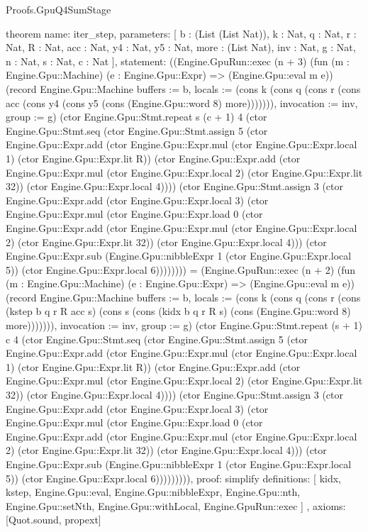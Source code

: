 \begin{lexlean}{Proofs.GpuQ4SumStage}
\begin{semanticmodule}
theorem{
  name: iter_step,
  parameters: [
    b : (List (List Nat)),
    k : Nat,
    q : Nat,
    r : Nat,
    R : Nat,
    acc : Nat,
    y4 : Nat,
    y5 : Nat,
    more : (List Nat),
    inv : Nat,
    g : Nat,
    n : Nat,
    s : Nat,
    c : Nat
  ],
  statement: ((Engine.GpuRun::exec (n + 3) (fun (m : Engine.Gpu::Machine) (e : Engine.Gpu::Expr) => (Engine.Gpu::eval m e)) (record Engine.Gpu::Machine {buffers := b, locals := (cons k (cons q (cons r (cons acc (cons y4 (cons y5 (cons (Engine.Gpu::word 8) more))))))), invocation := inv, group := g}) (ctor Engine.Gpu::Stmt.repeat s (c + 1) 4 (ctor Engine.Gpu::Stmt.seq (ctor Engine.Gpu::Stmt.assign 5 (ctor Engine.Gpu::Expr.add (ctor Engine.Gpu::Expr.mul (ctor Engine.Gpu::Expr.local 1) (ctor Engine.Gpu::Expr.lit R)) (ctor Engine.Gpu::Expr.add (ctor Engine.Gpu::Expr.mul (ctor Engine.Gpu::Expr.local 2) (ctor Engine.Gpu::Expr.lit 32)) (ctor Engine.Gpu::Expr.local 4)))) (ctor Engine.Gpu::Stmt.assign 3 (ctor Engine.Gpu::Expr.add (ctor Engine.Gpu::Expr.local 3) (ctor Engine.Gpu::Expr.mul (ctor Engine.Gpu::Expr.load 0 (ctor Engine.Gpu::Expr.add (ctor Engine.Gpu::Expr.mul (ctor Engine.Gpu::Expr.local 2) (ctor Engine.Gpu::Expr.lit 32)) (ctor Engine.Gpu::Expr.local 4))) (ctor Engine.Gpu::Expr.sub (Engine.Gpu::nibbleExpr 1 (ctor Engine.Gpu::Expr.local 5)) (ctor Engine.Gpu::Expr.local 6)))))))) = (Engine.GpuRun::exec (n + 2) (fun (m : Engine.Gpu::Machine) (e : Engine.Gpu::Expr) => (Engine.Gpu::eval m e)) (record Engine.Gpu::Machine {buffers := b, locals := (cons k (cons q (cons r (cons (kstep b q r R acc s) (cons s (cons (kidx b q r R s) (cons (Engine.Gpu::word 8) more))))))), invocation := inv, group := g}) (ctor Engine.Gpu::Stmt.repeat (s + 1) c 4 (ctor Engine.Gpu::Stmt.seq (ctor Engine.Gpu::Stmt.assign 5 (ctor Engine.Gpu::Expr.add (ctor Engine.Gpu::Expr.mul (ctor Engine.Gpu::Expr.local 1) (ctor Engine.Gpu::Expr.lit R)) (ctor Engine.Gpu::Expr.add (ctor Engine.Gpu::Expr.mul (ctor Engine.Gpu::Expr.local 2) (ctor Engine.Gpu::Expr.lit 32)) (ctor Engine.Gpu::Expr.local 4)))) (ctor Engine.Gpu::Stmt.assign 3 (ctor Engine.Gpu::Expr.add (ctor Engine.Gpu::Expr.local 3) (ctor Engine.Gpu::Expr.mul (ctor Engine.Gpu::Expr.load 0 (ctor Engine.Gpu::Expr.add (ctor Engine.Gpu::Expr.mul (ctor Engine.Gpu::Expr.local 2) (ctor Engine.Gpu::Expr.lit 32)) (ctor Engine.Gpu::Expr.local 4))) (ctor Engine.Gpu::Expr.sub (Engine.Gpu::nibbleExpr 1 (ctor Engine.Gpu::Expr.local 5)) (ctor Engine.Gpu::Expr.local 6))))))))),
  proof: simplify{
    definitions: [
      kidx,
      kstep,
      Engine.Gpu::eval,
      Engine.Gpu::nibbleExpr,
      Engine.Gpu::nth,
      Engine.Gpu::setNth,
      Engine.Gpu::withLocal,
      Engine.GpuRun::exec
    ]
  },
  axioms: [Quot.sound, propext]
}


\end{semanticmodule}
\end{lexlean}
